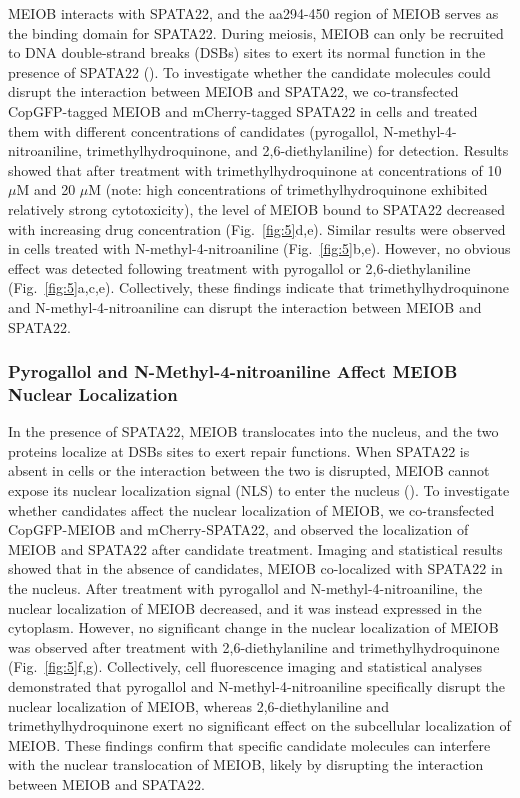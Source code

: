 \documentclass[unnumsec,webpdf,contemporary,large]{oup-authoring-template}%
\theoremstyle{thmstyleone}%
\theoremstyle{thmstyletwo}%
\theoremstyle{thmstylethree}%
\begin{document}
MEIOB interacts with SPATA22, and the aa294-450 region of MEIOB serves as the binding domain for SPATA22. During meiosis, MEIOB can only be recruited to DNA double-strand breaks (DSBs) sites to exert its normal function in the presence of SPATA22 (\citealt{1,2}). To investigate whether the candidate molecules could disrupt the interaction between MEIOB and SPATA22, we co-transfected CopGFP-tagged MEIOB and mCherry-tagged SPATA22 in cells and treated them with different concentrations of candidates (pyrogallol, N-methyl-4-nitroaniline, trimethylhydroquinone, and 2,6-diethylaniline) for detection. Results showed that after treatment with trimethylhydroquinone at concentrations of 10 $\mu$M and 20 $\mu$M (note: high concentrations of trimethylhydroquinone exhibited relatively strong cytotoxicity), the level of MEIOB bound to SPATA22 decreased with increasing drug concentration (Fig.~\ref{fig:5}d,e). Similar results were observed in cells treated with N-methyl-4-nitroaniline (Fig.~\ref{fig:5}b,e). However, no obvious effect was detected following treatment with pyrogallol or 2,6-diethylaniline (Fig.~\ref{fig:5}a,c,e). Collectively, these findings indicate that trimethylhydroquinone and N-methyl-4-nitroaniline can disrupt the interaction between MEIOB and SPATA22.




\subsubsection*{Pyrogallol and N-Methyl-4-nitroaniline Affect MEIOB Nuclear Localization}

In the presence of SPATA22, MEIOB translocates into the nucleus, and the two proteins localize at DSBs sites to exert repair functions. When SPATA22 is absent in cells or the interaction between the two is disrupted, MEIOB cannot expose its nuclear localization signal (NLS) to enter the nucleus (\citealt{10}). To investigate whether candidates affect the nuclear localization of MEIOB, we co-transfected CopGFP-MEIOB and mCherry-SPATA22, and observed the localization of MEIOB and SPATA22 after candidate treatment. Imaging and statistical results showed that in the absence of candidates, MEIOB co-localized with SPATA22 in the nucleus. After treatment with pyrogallol and N-methyl-4-nitroaniline, the nuclear localization of MEIOB decreased, and it was instead expressed in the cytoplasm. However, no significant change in the nuclear localization of MEIOB was observed after treatment with 2,6-diethylaniline and trimethylhydroquinone (Fig.~\ref{fig:5}f,g). Collectively, cell fluorescence imaging and statistical analyses demonstrated that pyrogallol and N-methyl-4-nitroaniline specifically disrupt the nuclear localization of MEIOB, whereas 2,6-diethylaniline and trimethylhydroquinone exert no significant effect on the subcellular localization of MEIOB. These findings confirm that specific candidate molecules can interfere with the nuclear translocation of MEIOB, likely by disrupting the interaction between MEIOB and SPATA22.
\end{document}
